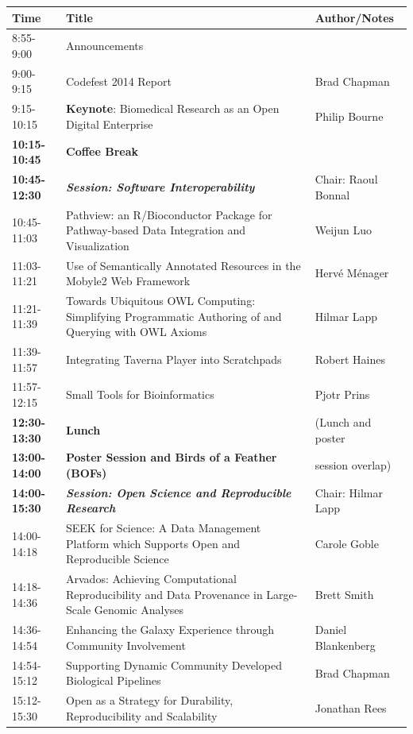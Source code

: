 \documentclass[10pt,oneside]{article}
\begin{document}
\begin{center}
\begin{tabular}{|p{2.0cm}|p{9.95cm}|p{3.25cm}|}
\hline
Time & Title & Author/Notes \\
\hline
8:55-9:00 & Announcements & \\
9:00-9:15 & Codefest 2014 Report & Brad Chapman\\
9:15-10:15 & \textbf{Keynote}: Biomedical Research as an Open Digital Enterprise & Philip Bourne\\
\hline
\textbf{10:15-10:45} & \textbf{Coffee Break} & \\
\hline
\textbf{10:45-12:30} & \textbf{\textit{Session: Software Interoperability}} & Chair: Raoul Bonnal\\
10:45-11:03 & Pathview: an R/Bioconductor Package for Pathway-based Data Integration and Visualization & Weijun Luo\\
11:03-11:21 & Use of Semantically Annotated Resources in the Mobyle2 Web Framework & Herv{\'e} M{\'e}nager\\
11:21-11:39 & Towards Ubiquitous OWL Computing: Simplifying Programmatic Authoring of and Querying with OWL Axioms & Hilmar Lapp\\
11:39-11:57 & Integrating Taverna Player into Scratchpads & Robert Haines\\
11:57-12:15 & Small Tools for Bioinformatics & Pjotr Prins\\
\hline
\textbf{12:30-13:30} & \textbf{Lunch} & (Lunch and poster\\
\textbf{13:00-14:00} & \textbf{Poster Session and Birds of a Feather (BOFs)} & session overlap)\\
\hline
\textbf{14:00-15:30} & \textbf{\textit{Session: Open Science and Reproducible Research}} & Chair: Hilmar Lapp\\
14:00-14:18 & SEEK for Science: A Data Management Platform which Supports Open and Reproducible Science & Carole Goble\\
14:18-14:36 & Arvados: Achieving Computational Reproducibility and Data Provenance in Large-Scale Genomic Analyses & Brett Smith\\
14:36-14:54 & Enhancing the Galaxy Experience through Community Involvement & Daniel Blankenberg\\
14:54-15:12 & Supporting Dynamic Community Developed Biological Pipelines & Brad Chapman\\
15:12-15:30 & Open as a Strategy for Durability, Reproducibility and Scalability & Jonathan Rees\\

\end{tabular}
\end{center}
\end{document}
